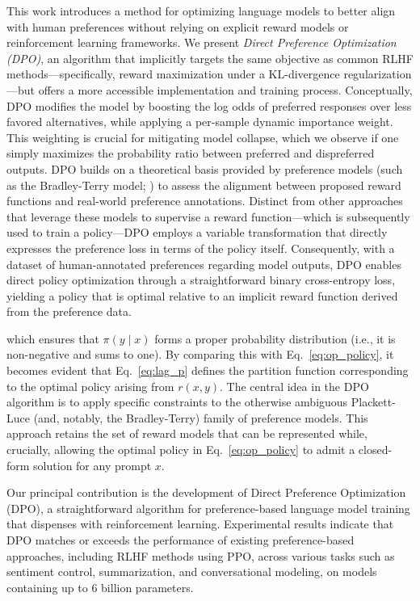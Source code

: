 This work introduces a method for optimizing language models to better align with human preferences without relying on explicit reward models or reinforcement learning frameworks. We present \textit{{Direct Preference Optimization} (DPO)}, an algorithm that implicitly targets the same objective as common RLHF methods—specifically, reward maximization under a KL-divergence regularization—but offers a more accessible implementation and training process. Conceptually, DPO modifies the model by boosting the log odds of preferred responses over less favored alternatives, while applying a per-sample dynamic importance weight. This weighting is crucial for mitigating model collapse, which we observe if one simply maximizes the probability ratio between preferred and dispreferred outputs. DPO builds on a theoretical basis provided by preference models (such as the Bradley-Terry model; \cite{bradley1952rankanalysis}) to assess the alignment between proposed reward functions and real-world preference annotations. Distinct from other approaches that leverage these models to supervise a reward function—which is subsequently used to train a policy—DPO employs a variable transformation that directly expresses the preference loss in terms of the policy itself. Consequently, with a dataset of human-annotated preferences regarding model outputs, DPO enables direct policy optimization through a straightforward binary cross-entropy loss, yielding a policy that is optimal relative to an implicit reward function derived from the preference data.

which ensures that $\pi(y\mid x)$ forms a proper probability distribution (i.e., it is non-negative and sums to one). By comparing this with Eq.~\ref{eq:op_policy}, it becomes evident that Eq.~\ref{eq:lag_p} defines the partition function corresponding to the optimal policy arising from $r(x, y)$. The central idea in the DPO algorithm is to apply specific constraints to the otherwise ambiguous Plackett-Luce (and, notably, the Bradley-Terry) family of preference models. This approach retains the set of reward models that can be represented while, crucially, allowing the optimal policy in Eq.~\ref{eq:op_policy} to admit a closed-form solution for any prompt $x$.

Our principal contribution is the development of Direct Preference Optimization (DPO), a straightforward algorithm for preference-based language model training that dispenses with reinforcement learning. Experimental results indicate that DPO matches or exceeds the performance of existing preference-based approaches, including RLHF methods using PPO, across various tasks such as sentiment control, summarization, and conversational modeling, on models containing up to 6 billion parameters.

